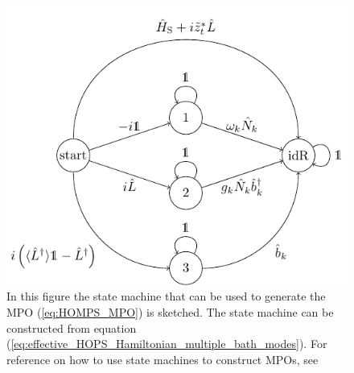 \begin{figure}
    \centering
    \includegraphics{figures/tikz/state_machine/state_machine.pdf}
    \caption{In this figure the state machine that can be used to generate the MPO (\ref{eq:HOMPS_MPO}) is sketched.
    The state machine can be constructed from equation (\ref{eq:effective_HOPS_Hamiltonian_multiple_bath_modes}). For
    reference on how to use state machines to construct MPOs, see \cite{Motruk:2016}}
    \label{fig:state_machine}
\end{figure}